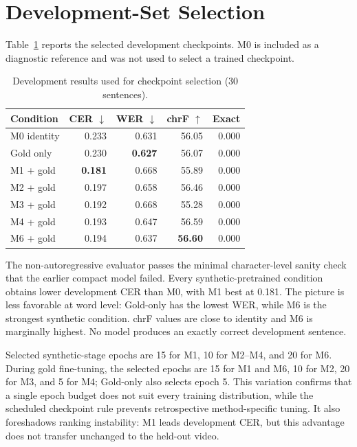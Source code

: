 \documentclass[12pt, a4paper, twoside, openany]{report}
\begin{document}
\section{Development-Set Selection}

Table~\ref{tab:development-results} reports the selected development checkpoints. M0 is included as a diagnostic reference and was not used to select a trained checkpoint.

\begin{table}[H]
	\centering
	\caption{Development results used for checkpoint selection (30 sentences).}
	\label{tab:development-results}
	\small
	\begin{tabular}{lrrrr}
		\toprule
		\textbf{Condition} & \textbf{CER $\downarrow$} & \textbf{WER $\downarrow$} & \textbf{chrF $\uparrow$} & \textbf{Exact} \\
		\midrule
		M0 identity & 0.233 & 0.631 & 56.05 & 0.000 \\
		Gold only & 0.230 & \textbf{0.627} & 56.07 & 0.000 \\
		M1 + gold & \textbf{0.181} & 0.668 & 55.89 & 0.000 \\
		M2 + gold & 0.197 & 0.658 & 56.46 & 0.000 \\
		M3 + gold & 0.192 & 0.668 & 55.28 & 0.000 \\
		M4 + gold & 0.193 & 0.647 & 56.59 & 0.000 \\
		M6 + gold & 0.194 & 0.637 & \textbf{56.60} & 0.000 \\
		\bottomrule
	\end{tabular}
\end{table}

The non-autoregressive evaluator passes the minimal character-level sanity check that the earlier compact model failed. Every synthetic-pretrained condition obtains lower development CER than M0, with M1 best at 0.181. The picture is less favorable at word level: Gold-only has the lowest WER, while M6 is the strongest synthetic condition. chrF values are close to identity and M6 is marginally highest. No model produces an exactly correct development sentence.

Selected synthetic-stage epochs are 15 for M1, 10 for M2--M4, and 20 for M6. During gold fine-tuning, the selected epochs are 15 for M1 and M6, 10 for M2, 20 for M3, and 5 for M4; Gold-only also selects epoch 5. This variation confirms that a single epoch budget does not suit every training distribution, while the scheduled checkpoint rule prevents retrospective method-specific tuning. It also foreshadows ranking instability: M1 leads development CER, but this advantage does not transfer unchanged to the held-out video.
\end{document}
